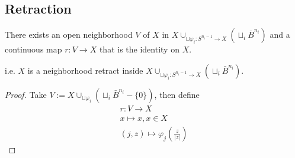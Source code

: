 \documentclass[Total.tex]{subfiles}
\begin{document}
	\subsection{Retraction}
		\begin{lemma}
			There exists an open neighborhood $V$ of $X$ in $X\cup_{\sqcup \varphi_i:S^{n_i-1}\rightarrow X} (\sqcup_i \bar{B}^{n_i})$ and a continuous map $r:V\rightarrow X$ that is the identity on $X$.
			
			i.e. $X$ is a neighborhood retract inside $X\cup_{\sqcup \varphi_i:S^{n_i-1}\rightarrow X} (\sqcup_i \bar{B}^{n_i})$.
		\end{lemma}
		\begin{proof}
			Take $V:=X\cup_{\sqcup \varphi_i} (\sqcup_i \bar{B}^{n_i}-\{0\})$, then define
			\begin{gather*}
				r:V\rightarrow X\\
				x\mapsto x,x\in X\\
				(j,z)\mapsto \varphi_j(\frac{z}{|z|})
			\end{gather*}
		\end{proof}
		\begin{center}
		\end{center}
\end{document}
